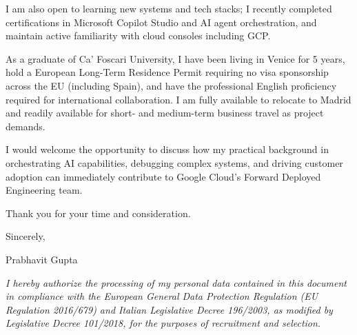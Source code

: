 \documentclass[10pt,a4paper]{article}
\begin{document}
\vspace{6pt}
I am also open to learning new systems and tech stacks; I recently completed certifications in Microsoft Copilot Studio and AI agent orchestration, and maintain active familiarity with cloud consoles including GCP.

\vspace{6pt}
As a graduate of Ca' Foscari University, I have been living in Venice for 5 years, hold a European Long-Term Residence Permit requiring no visa sponsorship across the EU (including Spain), and have the professional English proficiency required for international collaboration. I am fully available to relocate to Madrid and readily available for short- and medium-term business travel as project demands.

\vspace{6pt}
I would welcome the opportunity to discuss how my practical background in orchestrating AI capabilities, debugging complex systems, and driving customer adoption can immediately contribute to Google Cloud's Forward Deployed Engineering team.

\vspace{6pt}
Thank you for your time and consideration.

\vspace{6pt}
Sincerely,

\vspace{6pt}
\noindent Prabhavit Gupta

\vspace{16pt}
\noindent\textit{\small I hereby authorize the processing of my personal data contained in this document in compliance with the European General Data Protection Regulation (EU Regulation 2016/679) and Italian Legislative Decree 196/2003, as modified by Legislative Decree 101/2018, for the purposes of recruitment and selection.}
\end{document}
